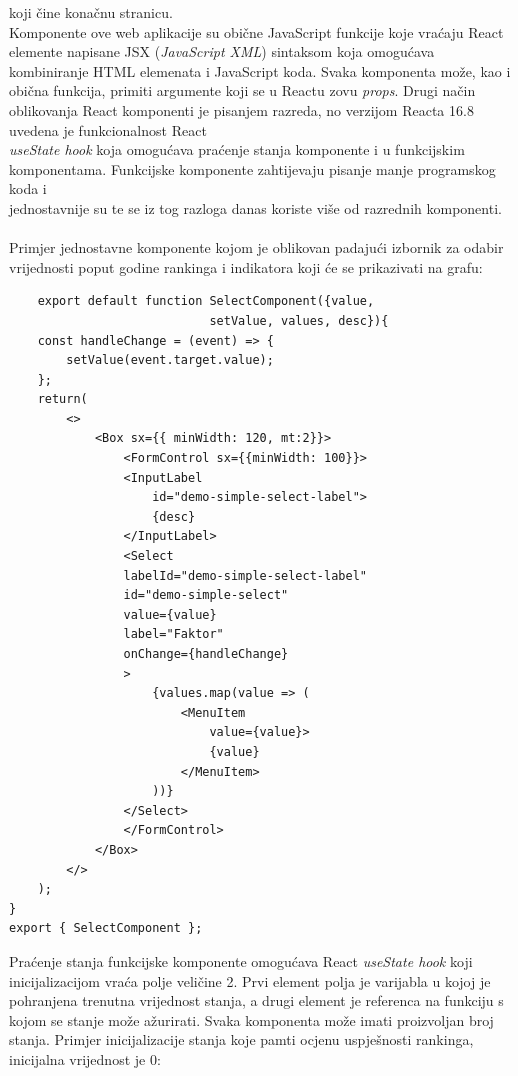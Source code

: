 \documentclass[times, utf8, zavrsni]{fer}
\begin{document}
koji čine konačnu stranicu. \\Komponente ove web aplikacije su obične JavaScript funkcije koje vraćaju React elemente napisane JSX (\emph{JavaScript XML}) sintaksom koja 
omogućava kombiniranje HTML elemenata i JavaScript koda. Svaka komponenta može, kao i obična funkcija, primiti argumente koji se u Reactu zovu \emph{props}.
Drugi način oblikovanja React komponenti je pisanjem razreda, no verzijom Reacta 16.8 uvedena je funkcionalnost React \\\emph{useState hook} koja omogućava 
praćenje stanja komponente i u funkcijskim komponentama. Funkcijske komponente zahtijevaju pisanje manje programskog koda i \\jednostavnije su te se iz tog
razloga danas koriste više od razrednih komponenti. 
\\\\Primjer jednostavne komponente kojom je oblikovan padajući izbornik za odabir \\vrijednosti poput godine rankinga i indikatora koji će se prikazivati na grafu:
\begin{verbatim}
    export default function SelectComponent({value, 
                            setValue, values, desc}){
    const handleChange = (event) => {
        setValue(event.target.value);
    };
    return(
        <>
            <Box sx={{ minWidth: 120, mt:2}}>
                <FormControl sx={{minWidth: 100}}>
                <InputLabel 
                    id="demo-simple-select-label">
                    {desc}
                </InputLabel>
                <Select
                labelId="demo-simple-select-label"
                id="demo-simple-select"
                value={value}
                label="Faktor"
                onChange={handleChange}
                >
                    {values.map(value => (
                        <MenuItem 
                            value={value}>
                            {value}
                        </MenuItem>
                    ))}
                </Select>
                </FormControl>
            </Box>
        </>
    );
}
export { SelectComponent };
\end{verbatim}
Praćenje stanja funkcijske komponente omogućava React \emph{useState hook} koji \\inicijalizacijom vraća polje veličine 2. Prvi element polja je varijabla u kojoj 
je pohranjena trenutna vrijednost stanja, a drugi element je referenca na funkciju s kojom se stanje može ažurirati. Svaka komponenta može imati 
proizvoljan broj stanja. Primjer inicijalizacije stanja koje pamti ocjenu uspješnosti rankinga, inicijalna vrijednost je 0:
\end{document}
